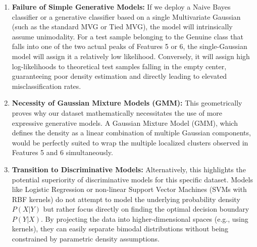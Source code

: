 \documentclass[12pt, a4paper]{article}
\begin{document}
\begin{enumerate}
    \item \textbf{Failure of Simple Generative Models:} If we deploy a Naive Bayes classifier or a generative classifier based on a single Multivariate Gaussian (such as the standard MVG or Tied MVG), the model will intrinsically assume unimodality. For a test sample belonging to the Genuine class that falls into one of the two actual peaks of Features 5 or 6, the single-Gaussian model will assign it a relatively low likelihood. Conversely, it will assign high log-likelihoods to theoretical test samples falling in the empty center, guaranteeing poor density estimation and directly leading to elevated misclassification rates.
    \item \textbf{Necessity of Gaussian Mixture Models (GMM):} This geometrically proves why our dataset mathematically necessitates the use of more expressive generative models. A Gaussian Mixture Model (GMM), which defines the density as a linear combination of multiple Gaussian components, would be perfectly suited to wrap the multiple localized clusters observed in Features 5 and 6 simultaneously.
    \item \textbf{Transition to Discriminative Models:} Alternatively, this highlights the potential superiority of discriminative models for this specific dataset. Models like Logistic Regression or non-linear Support Vector Machines (SVMs with RBF kernels) do not attempt to model the underlying probability density $P(X|Y)$ but rather focus directly on finding the optimal decision boundary $P(Y|X)$. By projecting the data into higher-dimensional spaces (e.g., using kernels), they can easily separate bimodal distributions without being constrained by parametric density assumptions.
\end{enumerate}
\end{document}
